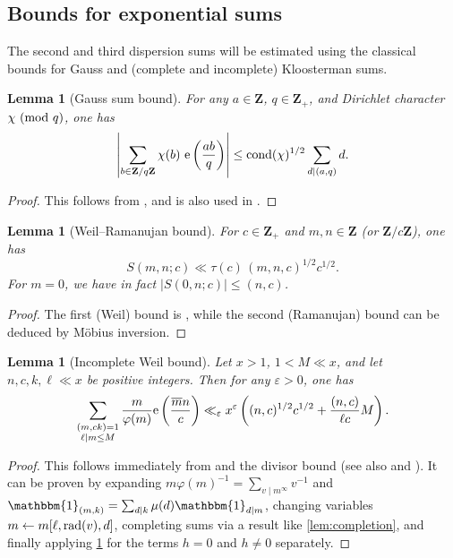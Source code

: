 \documentclass[reqno,11pt]{amsart}
\newtheorem{lemma}[theorem]{Lemma}
\theoremstyle{definition}
\theoremstyle{remark}
\numberwithin{equation}{section}
\newcommand{\Z}{\mathbf{Z}}
\newcommand{\e}{\textnormal{e}}
\newcommand{\one}{\mathbbm{1}}
\newcommand{\eps}{\varepsilon}
\renewcommand{\bar}{\overline}
\newcommand{\cond}{\textnormal{cond}}
\renewcommand{\pmod}[1]{\ (\textnormal{mod } #1)}
\newcommand{\rad}{\textnormal{rad}}
\begin{document}
\subsection{Bounds for exponential sums}

The second and third dispersion sums will be estimated using the classical bounds for Gauss and (complete and incomplete) Kloosterman sums.

\begin{lemma}[Gauss sum bound] \label{lem:gauss}
For any $a \in \Z$, $q \in \Z_+$, and Dirichlet character $\chi \pmod{q}$, one has
\[
    \left\vert \sum_{b \in \Z/q\Z} \chi(b)\ \e\left(\frac{ab}{q}\right) \right\vert
    \le 
    \cond(\chi)^{1/2} \sum_{d \mid (a, q)} d.
\]
\end{lemma}
\begin{proof}
This follows from \cite[Lemmas 3.1 and 3.2]{iwaniec2021analytic}, and is also used in \cite[\S 3.2]{drappeau2015theoremes}.
\end{proof}

\begin{lemma}[Weil--Ramanujan bound] \label{lem:weil}
For $c \in \Z_+$ and $m, n \in \Z$ (or $\Z/c\Z$), one has
\[
    S(m, n; c) \ll \tau(c)\, (m, n, c)^{1/2} c^{1/2}.
\]
For $m = 0$, we have in fact $|S(0, n; c)| \le (n, c)$.
\end{lemma}

\begin{proof}
The first (Weil) bound is \cite[Corollary 11.12]{iwaniec2021analytic}, while the second (Ramanujan) bound can be deduced by M\"obius inversion.
\end{proof}

\begin{lemma}[Incomplete Weil bound] \label{lem:incomplete-weil}
Let $x > 1$, $1 < M \ll x$, and let $n, c, k, \ell \ll x$ be positive integers. Then for any $\eps > 0$, one has
\[
    \sum_{\substack{(m, ck) = 1 \\ \ell \mid m \le M}} 
    \frac{m}{\varphi(m)} \e\left(\frac{\bar{m}n}{c}\right)
    \ll_{\eps}
    x^\eps \left((n, c)^{1/2} c^{1/2} + \frac{(n, c)}{\ell c} M \right).
\]
\end{lemma}
\begin{proof}
This follows immediately from \cite[(2.5)]{drappeau2015theoremes} and the divisor bound (see also \cite[Lemme 4]{fouvry1982repartition} and \cite[Lemma 16.1]{maynard2020primes}). It can be proven by expanding $m\varphi(m)^{-1} = \sum_{v \mid m^\infty} v^{-1}$ and $\one_{(m, k)} = \sum_{d \mid k} \mu(d) \one_{d \mid m}$, changing variables $m \gets m [\ell, \rad(v), d]$, completing sums via a result like \cref{lem:completion}, and finally applying \cref{lem:weil} for the terms $h = 0$ and $h \neq 0$ separately.
\end{proof}
\end{document}

